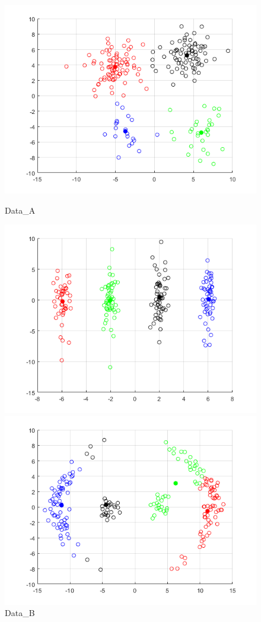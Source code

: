 \documentclass[12pt]{article}
\begin{document}
\begin{figure}[H]
  \includegraphics[width=\linewidth]{figs/1-b-kmeans-a.png}
  \caption{Data\_A}\label{fig:kmeans-a}
\endminipage\hfill
{}
  \includegraphics[width=\linewidth]{figs/1-b-kmeans-b.png}
  \caption{Data\_B}\label{fig:kmeans-b}
\endminipage\hfill
{}%
  \includegraphics[width=\linewidth]{figs/1-b-kmeans-c.png}

\end{figure}
\end{document}
